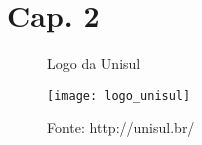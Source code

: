 \chapter{Cap. 2}

\lipsum

\begin{figure}[h]
\centering
\caption{Logo da Unisul}
\texttt{[image: logo\_unisul]}
\caption*{Fonte: http://unisul.br/}
\end{figure}

\lipsum[1]